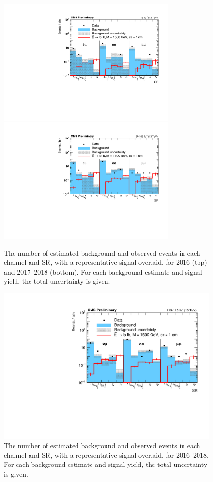 \begin{figure}
\centering
\includegraphics[width=0.8\textwidth]{figures/results/SR2016yields_CMSPreliminary.pdf}
\includegraphics[width=0.8\textwidth]{figures/results/SR201718yields_CMSPreliminary.pdf}
\caption{The number of estimated background and observed events in each channel and SR, with a representative signal overlaid, for 2016 (top) and 2017--2018 (bottom). For each background estimate and signal yield, the total uncertainty is given.}
\label{yields_individual}
\end{figure}

\begin{figure}
\centering
\includegraphics[width=\textwidth]{figures/results/SRRun2yields_CMSPreliminary.pdf}
\caption{The number of estimated background and observed events in each channel and SR, with a representative signal overlaid, for 2016--2018. For each background estimate and signal yield, the total uncertainty is given.}
\label{yields_combined}
\end{figure}